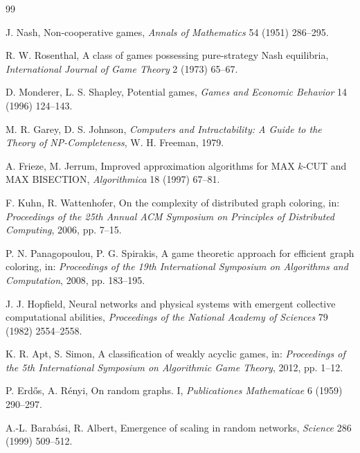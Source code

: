 \documentclass[preprint,12pt]{elsarticle}
\begin{document}
\begin{thebibliography}{99}

J. Nash,
Non-cooperative games,
\textit{Annals of Mathematics} 54 (1951) 286--295.

R. W. Rosenthal,
A class of games possessing pure-strategy Nash equilibria,
\textit{International Journal of Game Theory} 2 (1973) 65--67.

D. Monderer, L. S. Shapley,
Potential games,
\textit{Games and Economic Behavior} 14 (1996) 124--143.

M. R. Garey, D. S. Johnson,
\textit{Computers and Intractability: A Guide to the Theory of
NP-Completeness},
W. H. Freeman, 1979.

A. Frieze, M. Jerrum,
Improved approximation algorithms for MAX $k$-CUT and MAX BISECTION,
\textit{Algorithmica} 18 (1997) 67--81.

F. Kuhn, R. Wattenhofer,
On the complexity of distributed graph coloring,
in: \textit{Proceedings of the 25th Annual ACM Symposium on Principles of
Distributed Computing}, 2006, pp. 7--15.

P. N. Panagopoulou, P. G. Spirakis,
A game theoretic approach for efficient graph coloring,
in: \textit{Proceedings of the 19th International Symposium on Algorithms and
Computation}, 2008, pp. 183--195.

J. J. Hopfield,
Neural networks and physical systems with emergent collective computational
abilities,
\textit{Proceedings of the National Academy of Sciences} 79 (1982) 2554--2558.

K. R. Apt, S. Simon,
A classification of weakly acyclic games,
in: \textit{Proceedings of the 5th International Symposium on Algorithmic Game
Theory}, 2012, pp. 1--12.

P. Erd\H{o}s, A. R\'enyi,
On random graphs. I,
\textit{Publicationes Mathematicae} 6 (1959) 290--297.

A.-L. Barab\'asi, R. Albert,
Emergence of scaling in random networks,
\textit{Science} 286 (1999) 509--512.

\end{thebibliography}
\end{document}
